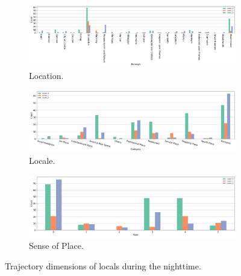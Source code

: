 \documentclass{article}
\theoremstyle{remark}
\begin{document}
\begin{figure}[!h]

\centering
\begin{subfigure}{0.6\textheight}
\centering
\includegraphics[width=1\linewidth]{figures/traj_location_nighttime_locals.png}
\caption{Location.}
\label{fig:traj_location_nighttime_locals}
\end{subfigure}
\begin{subfigure}{0.6\textheight}
\centering
\includegraphics[width=1\linewidth]{figures/traj_locale_nighttime_locals.png}
\caption{Locale.}
\label{fig:traj_locale_nighttime_locals}
\end{subfigure}
\begin{subfigure}{0.6\textheight}
\centering
\includegraphics[width=1\linewidth]{figures/traj_sense_nighttime_locals.png}
\caption{Sense of Place.}
\label{fig:traj_sense_nighttime_locals}
\end{subfigure}

\caption{Trajectory dimensions of locals during the nighttime.}
\label{fig:traj_dimension_nighttime_locas}
\end{figure}
\end{document}
